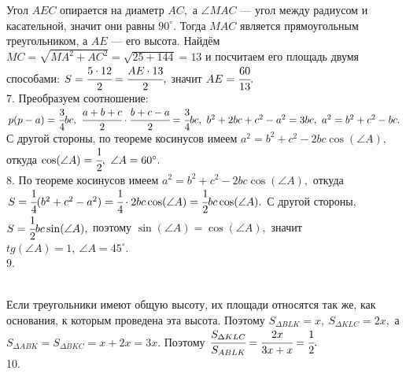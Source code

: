 \documentclass[12pt]{article}
\begin{document}
Угол $AEC$ опирается на диаметр $AC,$ а $\angle MAC$ --- угол между радиусом и касательной, значит они равны $90^\circ.$ Тогда $MAC$ является прямоугольным треугольником, а $AE$ --- его высота. Найдём $MC=\sqrt{MA^2+AC^2}=\sqrt{25+144}=13$ и посчитаем его площадь двумя способами: $S=\cfrac{5\cdot12}{2}=\cfrac{AE\cdot13}{2},$ значит $AE=\cfrac{60}{13}.$\\
7. Преобразуем соотношение: $p(p-a)=\cfrac{3}{4}bc,\ \cfrac{a+b+c}{2}\cdot\cfrac{b+c-a}{2}=\cfrac{3}{4}bc,\ b^2+2bc+c^2-a^2=3bc,\ a^2=b^2+c^2-bc.$ С другой стороны, по теореме косинусов имеем $a^2=b^2+c^2-2bc\cos(\angle A),$ откуда $\cos(\angle A)=\cfrac{1}{2},\ \angle A=60^\circ.$\\
8. По теореме косинусов имеем $a^2=b^2+c^2-2bc\cos(\angle A),$ откуда $S=\cfrac{1}{4}(b^2+c^2-a^2)=\cfrac{1}{4}\cdot 2bc\cos(\angle A)=\cfrac{1}{2}bc\cos(\angle A).$ С другой стороны, $S=\cfrac{1}{2}bc\sin(\angle A),$ поэтому $\sin(\angle A)=\cos(\angle A),$ значит $tg(\angle A)=1,\ \angle A=45^\circ.$\\
9. \begin{figure}[ht!]
\end{figure}\\
Если треугольники имеют общую высоту, их площади относятся так же, как основания, к которым проведена эта высота. Поэтому $S_{\Delta BLK}=x,\ S_{\Delta KLC}=2x,$ а $S_{\Delta ABK}=S_{\Delta BKC}=x+2x=3x.$ Поэтому $\cfrac{S_{\Delta KLC}}{S_{ABLK}}=\cfrac{2x}{3x+x}=\cfrac{1}{2}.$\\
10. \begin{figure}[ht!]
\end{figure}\\
\end{document}
